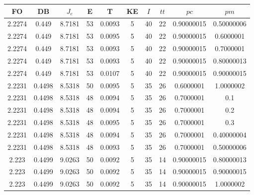 \begin{table}[h!]
    \footnotesize
    \begin{center}
        \begin{tabular}{|c|c|c|c|c|c|c|c|c|c|}
        \hline
            {\bf FO} & {\bf DB} & $J_e$ & {\bf E} & {\bf T} & {\bf KE} & $I$ & $tt$ & $pc$ & $pm$ \\
        \hline
        \hline
            2.2274 & 0.449  & 8.7181 & 53 & 0.0093 & 5 & 40 & 22 & 0.90000015 & 0.50000006\\
        \hline
        \hline
            2.2274 & 0.449  & 8.7181 & 53 & 0.0095 & 5 & 40 & 22 & 0.90000015 & 0.6000001\\
        \hline
        \hline
            2.2274 & 0.449  & 8.7181 & 53 & 0.0093 & 5 & 40 & 22 & 0.90000015 & 0.7000001\\
        \hline
        \hline
            2.2274 & 0.449  & 8.7181 & 53 & 0.0093 & 5 & 40 & 22 & 0.90000015 & 0.80000013\\
        \hline
        \hline
            2.2274 & 0.449  & 8.7181 & 53 & 0.0107 & 5 & 40 & 22 & 0.90000015 & 0.90000015\\
        \hline
        \hline
            2.2231 & 0.4498  & 8.5318 & 50 & 0.0095 & 5 & 35 & 26 & 0.6000001 & 1.0000002\\
        \hline
        \hline
            2.2231 & 0.4498  & 8.5318 & 48 & 0.0094 & 5 & 35 & 26 & 0.7000001 & 0.1\\
        \hline
        \hline
            2.2231 & 0.4498  & 8.5318 & 48 & 0.0094 & 5 & 35 & 26 & 0.7000001 & 0.2\\
        \hline
        \hline
            2.2231 & 0.4498  & 8.5318 & 48 & 0.0095 & 5 & 35 & 26 & 0.7000001 & 0.3\\
        \hline
        \hline
            2.2231 & 0.4498  & 8.5318 & 48 & 0.0094 & 5 & 35 & 26 & 0.7000001 & 0.40000004\\
        \hline
        \hline
            2.2231 & 0.4498  & 8.5318 & 48 & 0.0093 & 5 & 35 & 26 & 0.7000001 & 0.50000006\\
        \hline
        \hline
            2.223 & 0.4499  & 9.0263 & 50 & 0.0092 & 5 & 35 & 14 & 0.90000015 & 0.80000013\\
        \hline
        \hline
            2.223 & 0.4499  & 9.0263 & 50 & 0.0092 & 5 & 35 & 14 & 0.90000015 & 0.90000015\\
        \hline
        \hline
            2.223 & 0.4499  & 9.0263 & 50 & 0.0092 & 5 & 35 & 14 & 0.90000015 & 1.0000002\\

\end{tabular}
\end{center}
\end{table}
